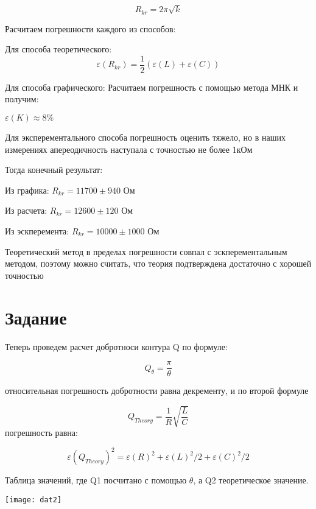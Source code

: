 \documentclass[a4paper,12pt]{article}
\begin{document}
	
	\begin{equation}
	R_{kr} = 2\pi\sqrt{k}
	\end{equation}
	
	Расчитаем погрешности каждого из способов:
	
	Для способа теоретического:
	\begin{equation}
	\varepsilon(R_{kr}) = \frac{1}2(\varepsilon(L) + \varepsilon(C))
	\end{equation}
	
	Для способа графического:
	Расчитаем погрешность с помощью метода МНК и получим:
	
	$\varepsilon(K) \approx 8\%$
	
	Для эксперементального способа погрешность оценить тяжело, но в наших измерениях апереодичность наступала с точностью не более 1кОм
	
	Тогда конечный результат:
	

	Из графика:
	$R_{kr} = 11700 \pm 940$ Ом 
	
	Из расчета:
	$R_{kr} =12600 \pm 120$ Ом
	
	Из эскперемента:
	$R_{kr}= 10000 \pm 1000$ Ом
	
	Теоретический метод в пределах погрешности совпал с эскперементальным методом, поэтому можно считать, что теория подтверждена достаточно с хорошей точностью
	
	\section{Задание}
	Теперь проведем расчет добротноси контура Q по формуле:
	
	\begin{equation}
	Q_\theta=\frac{\pi}\theta
	\end{equation}
	
	относительная погрешность добротности равна декременту,
	и по второй формуле
	
	\begin{equation}
	Q_{Theory} = \frac{1}{R}\sqrt{\frac{L}{C}}
	\end{equation}
	погрешность равна:
	
	\begin{equation}
	\varepsilon(Q_{Theory})^2 = \varepsilon(R)^2 + \varepsilon(L)^2/2 + \varepsilon(C)^2/2
	\end{equation}
	
	Таблица значений, где Q1 посчитано с помощью $\theta$, а Q2 теоретическое значение.
	
	\texttt{[image: dat2]}
	
\end{document}
